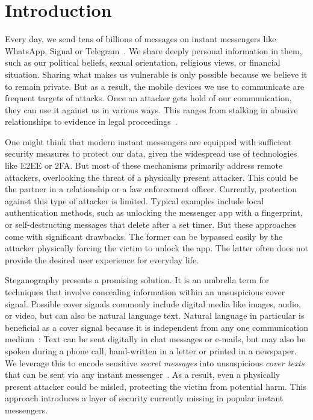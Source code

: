
\chapter{Introduction}\label{ch:introduction}
\glsresetall %


Every day, we send tens of billions of messages on instant messengers like WhatsApp, Signal or Telegram~\cite{smithMillionWhatsAppMessages2018}. We share deeply personal information in them, such as our political beliefs, sexual orientation, religious views, or financial situation. Sharing what makes us vulnerable is only possible because we believe it to remain private. But as a result, the mobile devices we use to communicate are frequent targets of attacks. Once an attacker gets hold of our communication, they can use it against us in various ways. This ranges from stalking in abusive relationships to evidence in legal proceedings~\cite{obrienNebraskaTeenMother2022,mackeyFrenchScientistDenied2025}.

One might think that modern instant messengers are equipped with sufficient security measures to protect our data, given the widespread use of technologies like \gls{E2EE} or \gls{2FA}. But most of these mechanisms primarily address remote attackers, overlooking the threat of a physically present attacker. This could be the partner in a relationship or a law enforcement officer. Currently, protection against this type of attacker is limited. Typical examples include local authentication methods, such as unlocking the messenger app with a fingerprint, or self-destructing messages that delete after a set timer. But these approaches come with significant drawbacks. The former can be bypassed easily by the attacker physically forcing the victim to unlock the app. The latter often does not provide the desired user experience for everyday life.

Steganography presents a promising solution. It is an umbrella term for techniques that involve concealing information within an unsuspicious cover signal. Possible cover signals commonly include digital media like images, audio, or video, but can also be natural language text. Natural language in particular is beneficial as a cover signal because it is independent from any one communication medium~\cite{zieglerNeuralLinguisticSteganography2019}: Text can be sent digitally in chat messages or e-mails, but may also be spoken during a phone call, hand-written in a letter or printed in a newspaper. We leverage this to encode sensitive \textit{secret messages} into unsuspicious \textit{cover texts} that can be sent via any instant messenger~\cite{zieglerNeuralLinguisticSteganography2019}. As a result, even a physically present attacker could be misled, protecting the victim from potential harm. This approach introduces a layer of security currently missing in popular instant messengers.

